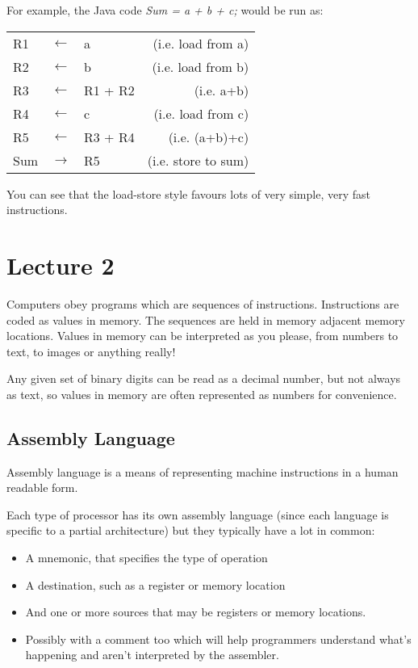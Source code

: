 \documentclass{article}
\begin{document}
For example, the Java code {\it Sum = a + b + c;} would be run as:

\begin{center}
    \begin{tabular}{l l l r}
        R1 & $\leftarrow$ & a & (i.e. load from a)\\
        R2 & $\leftarrow$ & b & (i.e. load from b)\\
        R3 & $\leftarrow$ & R1 + R2 & (i.e. a+b)\\
        R4 & $\leftarrow$ & c & (i.e. load from c)\\
        R5 & $\leftarrow$ & R3 + R4  & (i.e. (a+b)+c)\\
        Sum & $\rightarrow$ & R5 & (i.e. store to sum)\\
    \end{tabular}
\end{center}

You can see that the load-store style favours lots of very simple, very fast instructions.

\section{Lecture 2}
Computers obey programs which are sequences of instructions. Instructions are coded as values in memory. The sequences are held in memory adjacent memory locations. Values in memory can be interpreted as you please, from numbers to text, to images or anything really!

Any given set of binary digits can be read as a decimal number, but not always as text, so values in memory are often represented as numbers for convenience.

\subsection{Assembly Language}
Assembly language is a means of representing machine instructions in a human readable form.

Each type of processor has its own assembly language (since each language is specific to a partial architecture) but they typically have a lot in common:

\begin{itemize}
	\item A mnemonic, that specifies the type of operation
	\item A destination, such as a register or memory location
	\item And one or more sources that may be registers or memory locations.
	\item Possibly with a comment too which will help programmers understand what's happening and aren't interpreted by the assembler.
\end{itemize}
\end{document}
